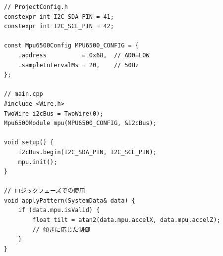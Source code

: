 \begin{lstlisting}[style=cppstyle, caption={Mpu6500Moduleの使用例}]
// ProjectConfig.h
constexpr int I2C_SDA_PIN = 41;
constexpr int I2C_SCL_PIN = 42;

const Mpu6500Config MPU6500_CONFIG = {
    .address          = 0x68,  // AD0=LOW
    .sampleIntervalMs = 20,    // 50Hz
};

// main.cpp
#include <Wire.h>
TwoWire i2cBus = TwoWire(0);
Mpu6500Module mpu(MPU6500_CONFIG, &i2cBus);

void setup() {
    i2cBus.begin(I2C_SDA_PIN, I2C_SCL_PIN);
    mpu.init();
}

// ロジックフェーズでの使用
void applyPattern(SystemData& data) {
    if (data.mpu.isValid) {
        float tilt = atan2(data.mpu.accelX, data.mpu.accelZ);
        // 傾きに応じた制御
    }
}
\end{lstlisting}
